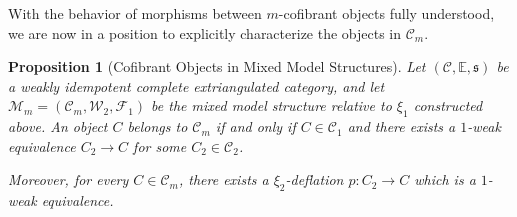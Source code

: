 \documentclass[11pt,a4paper]{amsart}
\numberwithin{equation}{section}
\theoremstyle{plain}
\newtheorem{prop}[thm]{Proposition}
\begin{document}
With the behavior of morphisms between $m$-cofibrant objects fully understood, we are now in a position to explicitly characterize the objects in $\mathcal{C}_m$.

\begin{prop}[Cofibrant Objects in Mixed Model Structures]\label{prop:cofibrant-characterization}
	Let $(\mathscr{C},\mathbb{E},\mathfrak{s})$ be a weakly idempotent complete extriangulated category, and let $\mathcal{M}_m=(\mathcal{C}_m,\mathcal{W}_2,\mathcal{F}_1)$ be the mixed model structure relative to $\xi_1$ constructed above.
	An object $C$ belongs to $\mathcal{C}_m$ if and only if
	\(C\in\mathcal{C}_1\)
	and there exists a $1$-weak equivalence
	\(C_2 \to C\)
	for some \(C_2\in\mathcal{C}_2\).
	
	Moreover, for every \(C\in\mathcal{C}_m\), there exists a $\xi_2$-deflation
	\(p:C_2\to C\)
	which is a $1$-weak equivalence.
\end{prop}
\end{document}
